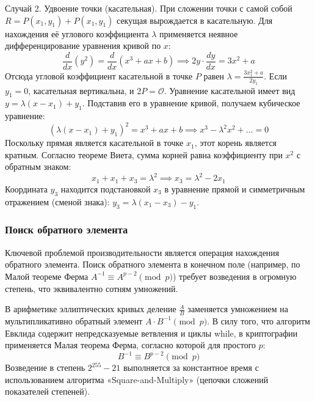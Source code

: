 Случай 2. Удвоение точки (касательная).
При сложении точки с самой собой $R = P(x_1, y_1) + P(x_1, y_1)$ секущая вырождается в касательную. Для нахождения её углового коэффициента $\lambda$ применяется неявное дифференцирование уравнения кривой по $x$:
\begin{equation}
    \frac{d}{dx}(y^2) = \frac{d}{dx}(x^3 + ax + b) \implies 2y \cdot \frac{dy}{dx} = 3x^2 + a
\end{equation}
Отсюда угловой коэффициент касательной в точке $P$ равен $\lambda = \frac{3x_1^2 + a}{2y_1}$. Если $y_1 = 0$, касательная вертикальна, и $2P = \mathcal{O}$.
Уравнение касательной имеет вид $y = \lambda(x - x_1) + y_1$. Подставив его в уравнение кривой, получаем кубическое уравнение:
\begin{equation}
    (\lambda(x - x_1) + y_1)^2 = x^3 + ax + b \implies x^3 - \lambda^2 x^2 + \dots = 0
\end{equation}
Поскольку прямая является касательной в точке $x_1$, этот корень является кратным. Согласно теореме Виета, сумма корней равна коэффициенту при $x^2$ с обратным знаком:
\begin{equation}
    x_1 + x_1 + x_3 = \lambda^2 \implies x_3 = \lambda^2 - 2x_1
\end{equation}
Координата $y_3$ находится подстановкой $x_3$ в уравнение прямой и симметричным отражением (сменой знака): $y_3 = \lambda(x_1 - x_3) - y_1$.

\subsubsection{Поиск обратного элемента}

Ключевой проблемой производительности является операция нахождения обратного элемента. Поиск обратного элемента в конечном поле (например, по Малой теореме Ферма $A^{-1} \equiv A^{p-2} \pmod p$) требует возведения в огромную степень, что эквивалентно сотням умножений.

В арифметике эллиптических кривых деление $\frac{A}{B}$ заменяется умножением на мультипликативно обратный элемент $A \cdot B^{-1} \pmod p$. В силу того, что алгоритм Евклида содержит непредсказуемые ветвления и циклы while, в криптографии применяется Малая теорема Ферма, согласно которой для простого $p$:
\begin{equation}
    B^{-1} \equiv B^{p-2} \pmod p
\end{equation}
Возведение в степень $2^{255}-21$ выполняется за константное время с использованием алгоритма «Square-and-Multiply» (цепочки сложений показателей степеней). 

